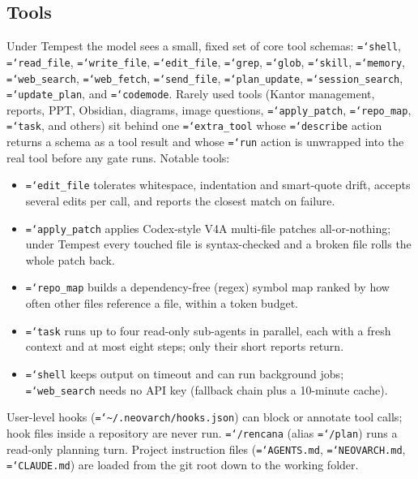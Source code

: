 \documentclass[11pt]{article}
\newcommand{\code}[1]{\texttt{\hyphenchar\font=`\-\relax #1}}
\begin{document}
\subsection{Tools}
Under Tempest the model sees a small, fixed set of core tool schemas: \code{shell}, \code{read\_file}, \code{write\_file}, \code{edit\_file},
\code{grep}, \code{glob}, \code{skill}, \code{memory}, \code{web\_search}, \code{web\_fetch}, \code{send\_file}, \code{plan\_update},
\code{session\_search}, \code{update\_plan}, and \code{codemode}. Rarely used tools (Kantor management, reports, PPT, Obsidian, diagrams, image questions,
\code{apply\_patch}, \code{repo\_map}, \code{task}, and others) sit behind one \code{extra\_tool} whose \code{describe} action returns a schema as a tool
result and whose \code{run} action is unwrapped into the real tool before any gate runs. Notable tools:
\begin{itemize}
\item \code{edit\_file} tolerates whitespace, indentation and smart-quote drift, accepts several edits per call, and reports the closest match on failure.
\item \code{apply\_patch} applies Codex-style V4A multi-file patches all-or-nothing; under Tempest every touched file is syntax-checked and a broken file rolls the whole patch back.
\item \code{repo\_map} builds a dependency-free (regex) symbol map ranked by how often other files reference a file, within a token budget.
\item \code{task} runs up to four read-only sub-agents in parallel, each with a fresh context and at most eight steps; only their short reports return.
\item \code{shell} keeps output on timeout and can run background jobs; \code{web\_search} needs no API key (fallback chain plus a 10-minute cache).
\end{itemize}
User-level hooks (\code{\textasciitilde/.neovarch/hooks.json}) can block or annotate tool calls; hook files inside a repository are never run.
\code{/rencana} (alias \code{/plan}) runs a read-only planning turn. Project instruction files (\code{AGENTS.md}, \code{NEOVARCH.md}, \code{CLAUDE.md}) are loaded from the git root down to the working folder.
\end{document}
